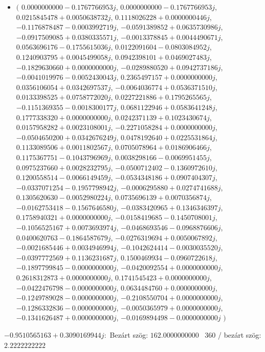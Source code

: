 \documentclass[14pt,a4paper]{article}
\begin{document}
\begin{itemize}
\item
$\big($
$0.0000000000-0.1767766953j$, $0.0000000000-0.1767766953j$, $0.0215845478+0.0050638732j$, $0.1118026228+0.0000000446j$, $-0.1176878487-0.0003992719j$, $-0.0591389852+0.0635730986j$, $-0.0917509085+0.0380335571j$, $-0.0013378845+0.0044490671j$, $0.0563696176-0.1755615036j$, $0.0122091604-0.0803084952j$, $0.1240903795+0.0045499058j$, $0.0942398101+0.0469027483j$, $-0.1829630660+0.0000000000j$, $-0.0289880520+0.0942737186j$, $-0.0041019976-0.0052430043j$, $0.2365497157+0.0000000000j$, $0.0356106054+0.0342697537j$, $-0.0064036774+0.0536371510j$, $0.0133398525+0.0758772020j$, $0.0227221886+0.1795265565j$, $-0.1151369355-0.0018300177j$, $0.0681122946+0.0583641248j$, $0.1777338320+0.0000000000j$, $0.0242371139+0.1023430674j$, $0.0157958282+0.0023108001j$, $-0.2271058284+0.0000000000j$, $-0.0504650200+0.0342676249j$, $0.0478192640+0.0225531864j$, $0.1133089506+0.0011802567j$, $0.0705078964+0.0186906466j$, $0.1175367751-0.1043796969j$, $0.0038298166-0.0069951455j$, $0.0975237660+0.0028232795j$, $-0.0500712402-0.1360972610j$, $0.1200558514-0.0066149459j$, $-0.0534348186+0.0907404307j$, $-0.0337071254-0.1957798942j$, $-0.0006295880+0.0274741688j$, $0.1305620630-0.0052980224j$, $0.0735696139+0.0070356874j$, $-0.0162753418-0.1567646580j$, $-0.0383420965+0.1346346397j$, $0.1758940321+0.0000000000j$, $-0.0158419685-0.1450708001j$, $-0.1056525167+0.0073693974j$, $-0.0468693546-0.0968876606j$, $0.0400620763-0.1864587679j$, $-0.0276319694+0.0050067892j$, $-0.0021685446+0.0034946994j$, $-0.1042624414-0.0030035520j$, $-0.0397772569+0.1136231687j$, $0.1500469934-0.0960722618j$, $-0.1897799845-0.0000000000j$, $-0.0420092554+0.0000000000j$, $0.2618312873+0.0000000000j$, $0.1741545423+0.0000000000j$, $-0.0422476798-0.0000000000j$, $0.0634484760+0.0000000000j$, $-0.1249789028-0.0000000000j$, $-0.2108550704+0.0000000000j$, $-0.1286332836-0.0000000000j$, $-0.0050365979+0.0000000000j$, $-0.1341626487+0.0000000000j$, $-0.0169894498-0.0000000000j$
$\big)$
\end{itemize}
$-0.9510565163+0.3090169944j$:\
Bezárt szög: $162.0000000000$ \
360 / bezárt szög: $2.2222222222$\
\end{document}
